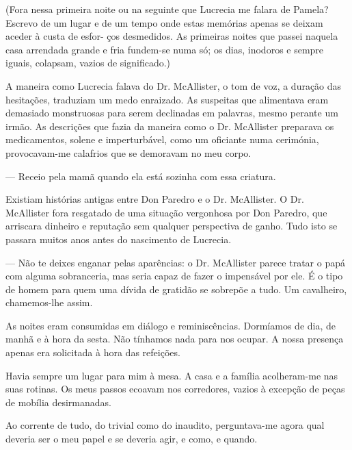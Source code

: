 (Fora nessa primeira noite ou na seguinte que Lucrecia me falara de
Pamela? Escrevo de um lugar e de um tempo onde estas memórias apenas se
deixam aceder à custa de esfor- ços desmedidos. As primeiras noites que
passei naquela casa arrendada grande e fria fundem-se numa só; os dias,
inodoros e sempre iguais, colapsam, vazios de significado.)

A maneira como Lucrecia falava do Dr. McAllister, o tom de voz, a
duração das hesitações, traduziam um medo enraizado. As suspeitas que alimentava eram demasiado monstruosas para serem
declinadas em palavras, mesmo perante um irmão. As descrições que fazia
da maneira como o Dr. McAllister preparava os medicamentos, solene e
imperturbável, como um oficiante numa cerimónia, provocavam-me calafrios
que se demoravam no meu corpo.

--- Receio pela mamã quando ela está sozinha com essa criatura.

Existiam histórias antigas entre Don Paredro e o Dr. McAllister. O Dr.
McAllister fora resgatado de uma situação vergonhosa por Don Paredro,
que arriscara dinheiro e reputação sem qualquer perspectiva de ganho.
Tudo isto se passara muitos anos antes do nascimento de Lucrecia.

--- Não te deixes enganar pelas aparências: o Dr. McAllister parece
  tratar o papá com alguma sobranceria, mas seria capaz de fazer o
  impensável por ele. É o tipo de homem para quem uma dívida de gratidão
  se sobrepõe a tudo. Um cavalheiro, chamemos-lhe assim.

As noites eram consumidas em diálogo e reminiscências. Dormíamos de dia,
de manhã e à hora da sesta. Não tínhamos nada para nos ocupar. A nossa
presença apenas era solicitada à hora das refeições.

Havia sempre um lugar para mim à mesa. A casa e a família acolheram-me
nas suas rotinas. Os meus passos ecoavam nos corredores, vazios à
excepção de peças de mobília desirmanadas.

Ao corrente de tudo, do trivial como do inaudito, perguntava-me agora
qual deveria ser o meu papel e se deveria agir, e como, e quando.

